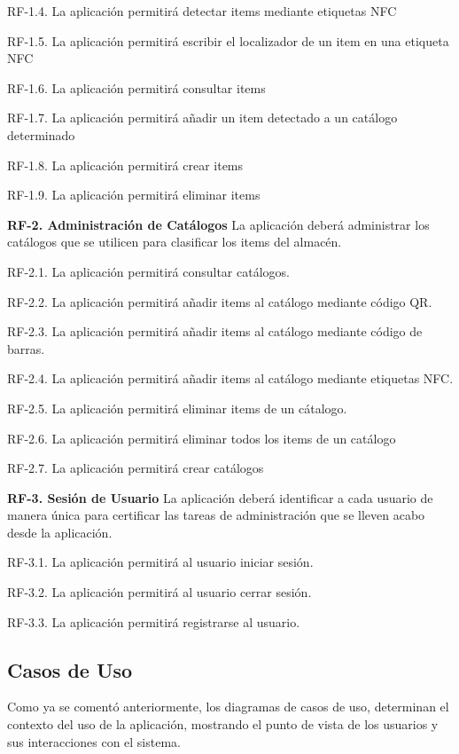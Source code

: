 \documentclass[a4paper,11pt]{book}
\begin{document}
RF-1.4. La aplicación permitirá detectar items mediante etiquetas NFC
	
RF-1.5. La aplicación permitirá escribir el localizador de un item en una etiqueta NFC
	
RF-1.6. La aplicación permitirá consultar items
	
RF-1.7. La aplicación permitirá añadir un item detectado a un catálogo determinado
	
RF-1.8. La aplicación permitirá crear items

RF-1.9. La aplicación permitirá eliminar items


\textbf{RF-2. Administración de Catálogos} La aplicación deberá administrar los catálogos que se utilicen para clasificar los items del almacén.   


	RF-2.1. La aplicación permitirá consultar catálogos.
	
	RF-2.2. La aplicación permitirá añadir items  al catálogo mediante código QR.
	
	RF-2.3. La aplicación permitirá añadir items al catálogo mediante código de barras.

	RF-2.4. La aplicación permitirá añadir items al catálogo mediante etiquetas NFC.
	
	RF-2.5. La aplicación permitirá eliminar items de un cátalogo.
	
	RF-2.6. La aplicación permitirá eliminar todos los items de un catálogo
	
	RF-2.7. La aplicación permitirá crear catálogos
	
	
\textbf{RF-3. Sesión de Usuario} La aplicación deberá identificar a cada usuario de manera única para certificar las tareas de administración que se lleven acabo desde la aplicación. 


	RF-3.1. La aplicación permitirá al usuario iniciar sesión.
	
	RF-3.2. La aplicación permitirá al usuario cerrar sesión.
	
	RF-3.3. La aplicación permitirá registrarse al usuario.



\subsection{Casos de Uso}
Como ya se comentó anteriormente, los diagramas de casos de uso, determinan el contexto del uso de la aplicación, mostrando el punto de vista de los usuarios  y sus interacciones con el sistema.
\end{document}

